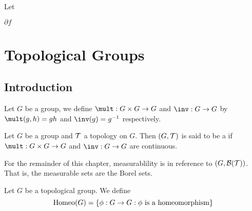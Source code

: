 \documentclass{book}
\begin{document}
	
	
	
	
	
	
	
	\begin{defn} \ld{}
	Let 
	\end{defn}
	
	\begin{defn} \ld{}
	$\partial f$
	\end{defn}	
	
	\begin{ex} \lex{}
	
	\end{ex}
	
	
	
	
	
	
	
	
	
	
	
	
	
	
	
	
	
	
	
	
	
	\newpage
	\chapter{Topological Groups}
	
	
	\section{Introduction}

	\begin{defn}
		Let $G$ be a group, we define $\mult:G \times G \rightarrow G$ and $\inv: G \rightarrow G$ by $\mult(g, h) = gh$ and $\inv(g) = g^{-1}$ respectively.
	\end{defn}
	
	\begin{defn}  
		Let $G$ be a group and $\mathcal{T}$ a topology on $G$. Then $(G, \mathcal{T})$ is said to be a  if $\mult:G \times G \rightarrow G$ and $\inv: G \rightarrow G$ are continuous.
	\end{defn}

	\begin{note}
		For the remainder of this chapter, measurablility is in reference to $(G, \mathcal{B}(\mathcal{T}))$. That is, the measurable sets are the Borel sets.
	\end{note}
	
	\begin{defn}  
		Let $G$ be a topological group. We define $$\operatorname{Homeo}(G) = \{\phi:G \rightarrow G: \phi \text{ is a homeomorphism}\}$$
	\end{defn}
	
\end{document}
